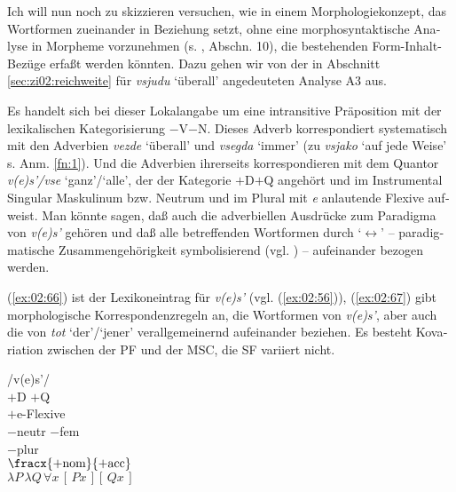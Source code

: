 \documentclass[output=paper, colorlinks, citecolor=brown, booklanguage=german]{langscibook}
\begin{document}
\begin{otherlanguage}{german}
Ich will nun noch zu skizzieren versuchen, wie in einem Morphologiekonzept, das Wortformen zueinander in Beziehung setzt, ohne eine morphosyntaktische Analyse in Morpheme vorzunehmen (s. \citealt{Matthews1991}, Abschn. 10), die bestehenden Form-Inhalt-Bezüge erfaßt werden könnten. Dazu gehen wir von der in Abschnitt \ref{sec:zi02:reichweite} für \textit{vsjudu} `überall' angedeuteten Analyse A3 aus.

Es handelt sich bei dieser Lokalangabe um eine intransitive Präposition mit der lexikalischen Kategorisierung $-$V$-$N. Dieses Adverb korrespondiert sys\-te\-ma\-tisch mit den Adverbien \textit{vezde} `überall' und \textit{vsegda} `immer' (zu \textit{vsjako} `auf jede Weise' s. Anm. \ref{fn:1}). Und die Adverbien ihrerseits korrespondieren mit dem Quantor \textit{v(e)s'/vse} `ganz'/`alle', der der Kategorie $+$D$+$Q angehört und im Instrumental Singular Maskulinum bzw. Neutrum und im Plural mit \textit{e} anlautende Flexive aufweist. Man könnte sagen, daß auch die adverbiellen Ausdrücke zum Paradigma von \textit{v(e)s'} gehören und daß alle betreffenden Wortformen durch `$\leftrightarrow$' -- paradigmatische Zusammengehörigkeit symbolisierend (vgl. \citealt{Jackendoff1975}) -- aufeinander bezogen werden. 

(\ref{ex:02:66}) ist der Lexikoneintrag für \textit{v(e)s'} (vgl. (\ref{ex:02:56})), (\ref{ex:02:67}) gibt morphologische Kor\-res\-pon\-denz\-re\-geln an, die Wortformen von \textit{v(e)s'}, aber auch die von \textit{tot} `der'/`jen\-er' verallgemeinernd aufeinander beziehen. Es besteht Kovariation zwi\-schen der PF und der MSC, die SF variiert nicht.

\ea\label{ex:02:66}
    /v(e)s'/ \\
    $+$D $+$Q \\
    $+$e-Flexive\\
    $-$neutr $-$fem\\
    $-$plur\\
    $\fracx{+\textrm{nom}}{+\textrm{acc}}$ \\
    $\lambda P\, \lambda Q\, \forall x\, [\, P x \,] [\, Q x \,]$
\z 


\end{otherlanguage}
\end{document}
